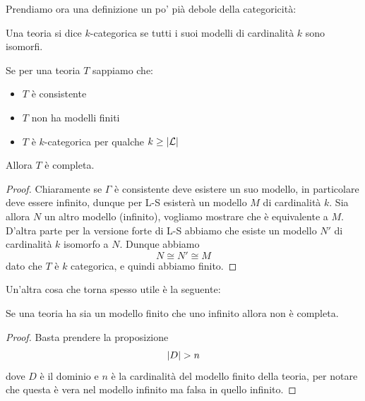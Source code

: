 \documentclass[11pt]{scrartcl}
\begin{document}
 	Prendiamo ora una definizione un po' pià debole della categoricità:
 	\begin{definition}
 		Una teoria si dice $k$-categorica se tutti i suoi modelli di cardinalità $k$ sono isomorfi.
 	\end{definition}
 	\begin{proposition}
 		Se per una teoria $T$ sappiamo che:
 		\begin{itemize}
 			\item  $T$ è consistente
 			\item  $T$ non ha modelli finiti
 			\item  $T$ è $k$-categorica per qualche $k\ge \left\lvert \mathcal{L} \right\rvert$
 		\end{itemize}
 		Allora $T$ è completa.
 	\end{proposition}
 	\begin{proof}
 		Chiaramente se $\Gamma$ è consistente deve esistere un suo modello, in particolare deve essere infinito, dunque per L-S esisterà un modello $M$ di cardinalità $k$. Sia allora $N$ un altro modello (infinito), vogliamo mostrare che è equivalente a $M$. D'altra parte per la versione forte di L-S abbiamo che esiste un modello $N'$ di cardinalità $k$ isomorfo a $N$. Dunque abbiamo
 		$$N\cong N'\cong M$$
 		dato che $T$ è $k$ categorica, e quindi abbiamo finito.
 	\end{proof}
 	Un'altra cosa che torna spesso utile è la seguente:
 	\begin{proposition}
 		Se una teoria ha sia un modello finito che uno infinito allora non è completa.
 	\end{proposition}
 	\begin{proof}
 		Basta prendere la proposizione
 		$$\left\lvert D \right\rvert> n$$
 		dove $D$ è il dominio e $n$ è la cardinalità del modello finito della teoria, per notare che questa è vera nel modello infinito ma falsa in quello infinito.
 	\end{proof}
\end{document}
